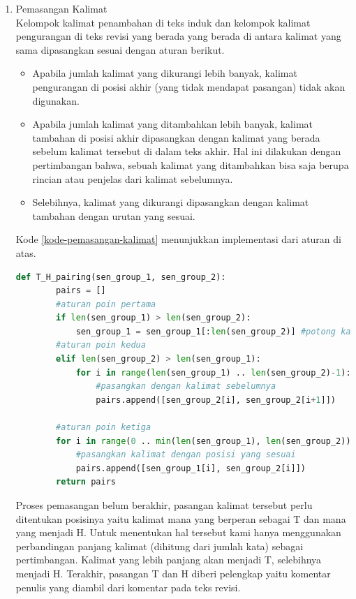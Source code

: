\begin{enumerate}
	\item Pemasangan Kalimat\\
	Kelompok kalimat penambahan di teks induk dan kelompok kalimat pengurangan di teks revisi yang berada yang berada di antara kalimat yang sama dipasangkan sesuai dengan aturan berikut.
	\begin{itemize}
		\item Apabila jumlah kalimat yang dikurangi lebih banyak, kalimat pengurangan di posisi akhir (yang tidak mendapat pasangan) tidak akan digunakan.
		\item Apabila jumlah kalimat yang ditambahkan lebih banyak, kalimat tambahan  di posisi akhir dipasangkan dengan kalimat yang berada sebelum kalimat tersebut di dalam teks akhir. Hal ini  dilakukan dengan pertimbangan bahwa, sebuah kalimat yang ditambahkan bisa saja berupa rincian atau penjelas dari kalimat sebelumnya.
		\item Selebihnya, kalimat yang dikurangi dipasangkan dengan kalimat tambahan dengan urutan yang sesuai.
	\end{itemize}
	Kode \ref{kode-pemasangan-kalimat} menunjukkan implementasi dari aturan di atas.
	\begin{lstlisting}[language=Python, caption={Pemasangan kalimat}, label={kode-pemasangan-kalimat}]
	def T_H_pairing(sen_group_1, sen_group_2):
		pairs = []
		#aturan poin pertama
		if len(sen_group_1) > len(sen_group_2): 
			sen_group_1 = sen_group_1[:len(sen_group_2)] #potong kalimat yang berlebih
		#aturan poin kedua
		elif len(sen_group_2) > len(sen_group_1): 
			for i in range(len(sen_group_1) .. len(sen_group_2)-1):
				#pasangkan dengan kalimat sebelumnya
				pairs.append([sen_group_2[i], sen_group_2[i+1]])
		
		#aturan poin ketiga
		for i in range(0 .. min(len(sen_group_1), len(sen_group_2))):
			#pasangkan kalimat dengan posisi yang sesuai
			pairs.append([sen_group_1[i], sen_group_2[i]])
		return pairs	
	\end{lstlisting}
	Proses pemasangan belum berakhir, pasangan kalimat tersebut perlu ditentukan posisinya yaitu kalimat mana yang berperan sebagai T dan mana yang menjadi H. Untuk menentukan hal tersebut kami hanya menggunakan perbandingan panjang kalimat (dihitung dari jumlah kata) sebagai pertimbangan. Kalimat yang lebih panjang akan menjadi T, selebihnya menjadi H. Terakhir, pasangan T dan H diberi pelengkap yaitu komentar penulis yang diambil dari komentar pada teks revisi.

\end{enumerate}
